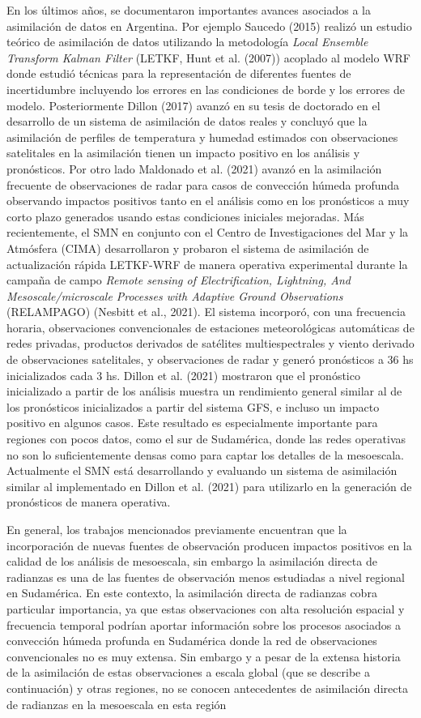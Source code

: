 \documentclass[12pt,oneside,a4paper]{reedthesis}
\begin{document}
En los últimos años, se documentaron importantes avances asociados a la asimilación de datos en Argentina. Por ejemplo Saucedo (2015) realizó un estudio teórico de asimilación de datos utilizando la metodología \emph{Local Ensemble Transform Kalman Filter} (LETKF, Hunt et al. (2007)) acoplado al modelo WRF donde estudió técnicas para la representación de diferentes fuentes de incertidumbre incluyendo los errores en las condiciones de borde y los errores de modelo. Posteriormente Dillon (2017) avanzó en su tesis de doctorado en el desarrollo de un sistema de asimilación de datos reales y concluyó que la asimilación de perfiles de temperatura y humedad estimados con observaciones satelitales en la asimilación tienen un impacto positivo en los análisis y pronósticos. Por otro lado Maldonado et al. (2021) avanzó en la asimilación frecuente de observaciones de radar para casos de convección húmeda profunda observando impactos positivos tanto en el análisis como en los pronósticos a muy corto plazo generados usando estas condiciones iniciales mejoradas. Más recientemente, el SMN en conjunto con el Centro de Investigaciones del Mar y la Atmósfera (CIMA) desarrollaron y probaron el sistema de asimilación de actualización rápida LETKF-WRF de manera operativa experimental durante la campaña de campo \emph{Remote sensing of Electrification, Lightning, And Mesoscale/microscale Processes with Adaptive Ground Observations} (RELAMPAGO) (Nesbitt et al., 2021). El sistema incorporó, con una frecuencia horaria, observaciones convencionales de estaciones meteorológicas automáticas de redes privadas, productos derivados de satélites multiespectrales y viento derivado de observaciones satelitales, y observaciones de radar y generó pronósticos a 36 hs inicializados cada 3 hs. Dillon et al. (2021) mostraron que el pronóstico inicializado a partir de los análisis muestra un rendimiento general similar al de los pronósticos inicializados a partir del sistema GFS, e incluso un impacto positivo en algunos casos. Este resultado es especialmente importante para regiones con pocos datos, como el sur de Sudamérica, donde las redes operativas no son lo suficientemente densas como para captar los detalles de la mesoescala. Actualmente el SMN está desarrollando y evaluando un sistema de asimilación similar al implementado en Dillon et al. (2021) para utilizarlo en la generación de pronósticos de manera operativa.

En general, los trabajos mencionados previamente encuentran que la incorporación de nuevas fuentes de observación producen impactos positivos en la calidad de los análisis de mesoescala, sin embargo la asimilación directa de radianzas es una de las fuentes de observación menos estudiadas a nivel regional en Sudamérica. En este contexto, la asimilación directa de radianzas cobra particular importancia, ya que estas observaciones con alta resolución espacial y frecuencia temporal podrían aportar información sobre los procesos asociados a convección húmeda profunda en Sudamérica donde la red de observaciones convencionales no es muy extensa. Sin embargo y a pesar de la extensa historia de la asimilación de estas observaciones a escala global (que se describe a continuación) y otras regiones, no se conocen antecedentes de asimilación directa de radianzas en la mesoescala en esta región
\end{document}
